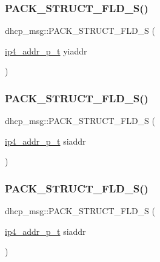 \subsubsection{\texorpdfstring{P\+A\+C\+K\+\_\+\+S\+T\+R\+U\+C\+T\+\_\+\+F\+L\+D\+\_\+\+S()}{PACK\_STRUCT\_FLD\_S()}\hspace{0.1cm}{\footnotesize\ttfamily [4/8]}}
{\footnotesize\ttfamily dhcp\+\_\+msg\+::\+P\+A\+C\+K\+\_\+\+S\+T\+R\+U\+C\+T\+\_\+\+F\+L\+D\+\_\+S (\begin{DoxyParamCaption}\item[{\hyperlink{native_2lwip_2src_2include_2lwip_2prot_2ip4_8h_ae5011654fcbadf6b6582b8d49446107f}{ip4\+\_\+addr\+\_\+p\+\_\+t}}]{yiaddr }\end{DoxyParamCaption})}

\mbox{\label{structdhcp__msg_adaca7852f7ece62ca23221a1f988fff1}} 
\subsubsection{\texorpdfstring{P\+A\+C\+K\+\_\+\+S\+T\+R\+U\+C\+T\+\_\+\+F\+L\+D\+\_\+\+S()}{PACK\_STRUCT\_FLD\_S()}\hspace{0.1cm}{\footnotesize\ttfamily [5/8]}}
{\footnotesize\ttfamily dhcp\+\_\+msg\+::\+P\+A\+C\+K\+\_\+\+S\+T\+R\+U\+C\+T\+\_\+\+F\+L\+D\+\_\+S (\begin{DoxyParamCaption}\item[{\hyperlink{native_2lwip_2src_2include_2lwip_2prot_2ip4_8h_ae5011654fcbadf6b6582b8d49446107f}{ip4\+\_\+addr\+\_\+p\+\_\+t}}]{siaddr }\end{DoxyParamCaption})}

\mbox{\label{structdhcp__msg_adaca7852f7ece62ca23221a1f988fff1}} 
\subsubsection{\texorpdfstring{P\+A\+C\+K\+\_\+\+S\+T\+R\+U\+C\+T\+\_\+\+F\+L\+D\+\_\+\+S()}{PACK\_STRUCT\_FLD\_S()}\hspace{0.1cm}{\footnotesize\ttfamily [6/8]}}
{\footnotesize\ttfamily dhcp\+\_\+msg\+::\+P\+A\+C\+K\+\_\+\+S\+T\+R\+U\+C\+T\+\_\+\+F\+L\+D\+\_\+S (\begin{DoxyParamCaption}\item[{\hyperlink{native_2lwip_2src_2include_2lwip_2prot_2ip4_8h_ae5011654fcbadf6b6582b8d49446107f}{ip4\+\_\+addr\+\_\+p\+\_\+t}}]{siaddr }\end{DoxyParamCaption})}

